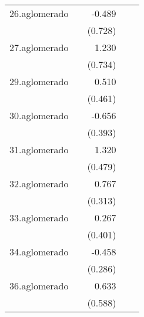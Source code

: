{\begin{longtable}{l*{4}{D{.}{.}{-1}}}
\addlinespace
26.aglomerado&                     &      -0.489         &                     &                     \\
            &                     &     (0.728)         &                     &                     \\
\addlinespace
27.aglomerado&                     &       1.230         &                     &                     \\
            &                     &     (0.734)         &                     &                     \\
\addlinespace
29.aglomerado&                     &       0.510         &                     &                     \\
            &                     &     (0.461)         &                     &                     \\
\addlinespace
30.aglomerado&                     &      -0.656         &                     &                     \\
            &                     &     (0.393)         &                     &                     \\
\addlinespace
31.aglomerado&                     &       1.320\sym{**} &                     &                     \\
            &                     &     (0.479)         &                     &                     \\
\addlinespace
32.aglomerado&                     &       0.767\sym{*}  &                     &                     \\
            &                     &     (0.313)         &                     &                     \\
\addlinespace
33.aglomerado&                     &       0.267         &                     &                     \\
            &                     &     (0.401)         &                     &                     \\
\addlinespace
34.aglomerado&                     &      -0.458         &                     &                     \\
            &                     &     (0.286)         &                     &                     \\
\addlinespace
36.aglomerado&                     &       0.633         &                     &                     \\
            &                     &     (0.588)         &                     &                     \\

\end{longtable}}
